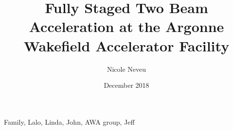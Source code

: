 \documentclass{iitthesis}
\begin{document}
\title{Fully Staged Two Beam Acceleration at the Argonne Wakefield Accelerator Facility}

\author{Nicole Neveu }
\date{December 2018}
\copyrightnoticetrue      %
\maketitle                %


\prelimpages         %

\begin{acknowledgement}     %
	\par  Family, Lalo, Linda, John, AWA group, Jeff
\end{acknowledgement}

\tableofcontents
\clearpage

\listoftables
\clearpage

\listoffigures
\clearpage


\listofsymbols
{}

\clearpage
\end{document}

